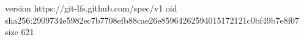 version https://git-lfs.github.com/spec/v1
oid sha256:2909734e5982ec7b7708efb88cae26e85964262594015172121c0bf49b7e8f07
size 621
